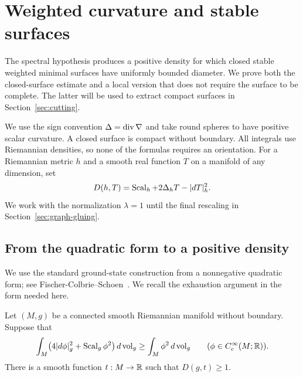 \section{Weighted curvature and stable surfaces}
\label{sec:weighted-surfaces}

The spectral hypothesis produces a positive density for which closed
stable weighted minimal surfaces have uniformly bounded diameter.  We
prove both the closed-surface estimate and a local version that does not require the surface to be
complete.  The latter will be used to extract compact surfaces in
Section~\ref{sec:cutting}.

We use the sign convention $\Delta=\operatorname{div}\nabla$ and take round spheres to
have positive scalar curvature.  A closed surface is compact without
boundary.  All integrals use Riemannian densities, so none of the formulas
requires an orientation.  For a Riemannian metric
$h$ and a smooth real function $T$ on a manifold of any dimension, set
\begin{equation}\label{eq:weighted-scalar}
 D(h,T)=\operatorname{Scal}_h+2\Delta_hT-|dT|_h^2.
\end{equation}
We work with the normalization $\lambda=1$ until the final rescaling in
Section~\ref{sec:graph-gluing}.

\subsection{From the quadratic form to a positive density}

We use the standard ground-state construction from a nonnegative
quadratic form; see Fischer-Colbrie--Schoen~\cite[Theorem~1]{FischerColbrieSchoen1980}.
We recall the exhaustion argument in the form needed here.

\begin{lemma}\label{lem:positive-weight}
Let $(M,g)$ be a connected smooth Riemannian manifold without boundary.
Suppose that
\[
 \int_M\bigl(4|d\phi|_g^2+\operatorname{Scal}_g\phi^2\bigr)\,d\operatorname{vol}_g
 \ge \int_M\phi^2\,d\operatorname{vol}_g
 \qquad(\phi\in C_c^\infty(M;\mathbb R)).
\]
There is a smooth function $t:M\to\mathbb R$ such that $D(g,t)\ge1$.
\end{lemma}

